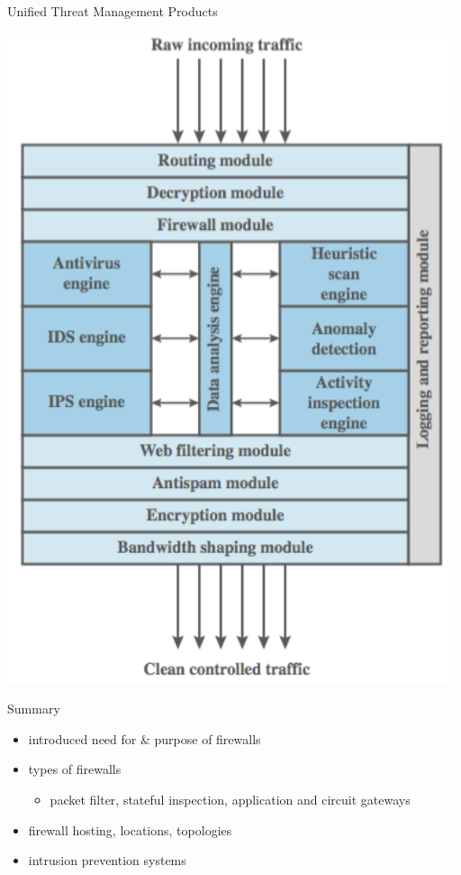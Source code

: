 \documentclass{beamer}
\begin{document}
\begin{frame}{Unified Threat Management Products}
  \begin{center}
    \includegraphics[width=0.45\linewidth]{utmp}
  \end{center}
\end{frame}

\begin{frame}{Summary}
  \begin{itemize}
  \item introduced need for \& purpose of firewalls 
  \item types of firewalls 
    \begin{itemize}
    \item packet filter, stateful inspection, application and 
      circuit gateways 
    \end{itemize}
  \item firewall hosting, locations, topologies 
  \item intrusion prevention systems
  \end{itemize}
\end{frame}
\end{document}
